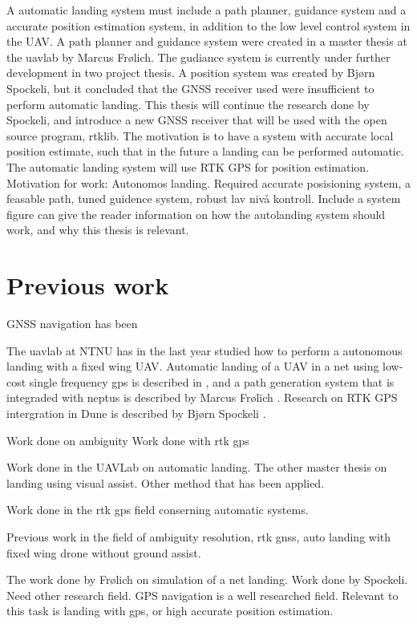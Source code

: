 A automatic landing system must include a path planner, guidance system and a accurate position estimation system, in addition to the low level control system in the UAV. A path planner and guidance system were created in a master thesis at the uavlab by Marcus Frølich. The gudiance system is currently under further development in two project thesis. A position system was created by Bjørn Spockeli, but it concluded that the GNSS receiver used were insufficient to perform automatic landing. This thesis will continue the research done by Spockeli, and introduce a new GNSS receiver that will be used with the open source program, rtklib. The motivation is to have a system with accurate local position estimate, such that in the future a landing can be performed automatic.
The automatic landing system will use RTK GPS for position estimation. 
Motivation for work: Autonomos landing. Required accurate posisioning system, a feasable path, tuned guidence system, robust lav nivå kontroll. Include a system figure can give the reader information on how the autolanding system should work, and why this thesis is relevant.
\section{Previous work}
GNSS navigation has been

The uavlab at NTNU has in the last year studied how to perform a autonomous landing with a fixed wing UAV. Automatic landing of a UAV in a net using low-cost single frequency gps is described in \citep{Skulstad&Syversen}, and a path generation system that is integraded with neptus is described by Marcus Frølich \citep{Froelich}. Research on RTK GPS intergration in Dune is described by Bjørn Spockeli \citep{Spockeli}.

Work done on ambiguity
\cite{Ambiguity:Estimation} \citep{LAMBDA:METHOD} \citep{LAMBDAMETHOD} \citep{GeodeticBaselines}
Work done with rtk gps
\citep{Low-costRTK}  \citep{3D-RTK} 

Work done in the UAVLab on automatic landing. The other master thesis on landing using visual assist. Other method that has been applied. 

Work done in the rtk gps field conserning automatic systems. 

Previous work in the field of ambiguity resolution, rtk gnss, auto landing with fixed wing drone without ground assist.

The work done by Frølich on simulation of a net landing. Work done by Spockeli. Need other research field. GPS navigation is a well researched field. Relevant to this task is landing with gps, or high accurate position estimation. 

